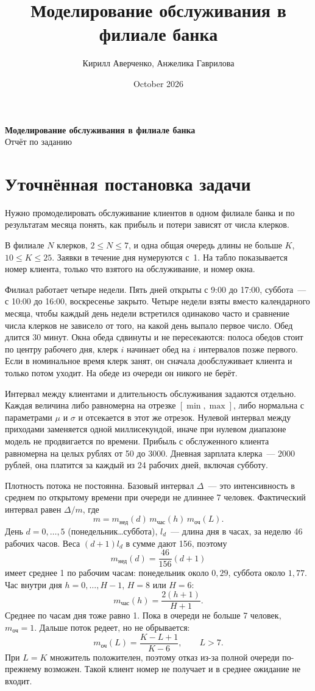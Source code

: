 \documentclass[a4paper,12pt]{article}
\title{Моделирование обслуживания в филиале банка}
\author{Кирилл Аверченко, Анжелика Гаврилова}
\date{October 2026}
\begin{document}
\begin{center}
{\Large\bfseries Моделирование обслуживания в филиале банка}\\[0.55em]
Отчёт по заданию\\[0.25em]
\end{center}

\section{Уточнённая постановка задачи}

Нужно промоделировать обслуживание клиентов в одном филиале банка и по результатам месяца понять, как прибыль и потери зависят от числа клерков.

В филиале \(N\) клерков, \(2 \le N \le 7\), и одна общая очередь длины не больше \(K\), \(10 \le K \le 25\). Заявки в течение дня нумеруются с~1. На табло показывается номер клиента, только что взятого на обслуживание, и номер окна.

Филиал работает четыре недели. Пять дней открыты с 9:00 до 17:00, суббота~--- с 10:00 до 16:00, воскресенье закрыто. Четыре недели взяты вместо календарного месяца, чтобы каждый день недели встретился одинаково часто и сравнение числа клерков не зависело от того, на какой день выпало первое число. Обед длится 30 минут. Окна обеда сдвинуты и не пересекаются: полоса обедов стоит по центру рабочего дня, клерк \(i\) начинает обед на \(i\) интервалов позже первого. Если в номинальное время клерк занят, он сначала дообслуживает клиента и только потом уходит. На обеде из очереди он никого не берёт.

Интервал между клиентами и длительность обслуживания задаются отдельно. Каждая величина либо равномерна на отрезке \([\min,\max]\), либо нормальна с параметрами \(\mu\) и \(\sigma\) и отсекается в этот же отрезок. Нулевой интервал между приходами заменяется одной миллисекундой, иначе при нулевом диапазоне модель не продвигается по времени. Прибыль с обслуженного клиента равномерна на целых рублях от 50 до 3000. Дневная зарплата клерка~--- 2000 рублей, она платится за каждый из 24 рабочих дней, включая субботу.

Плотность потока не постоянна. Базовый интервал \(\Delta\)~--- это интенсивность в среднем по открытому времени при очереди не длиннее 7 человек. Фактический интервал равен \(\Delta / m\), где
\[
m = m_{\text{нед}}(d)\, m_{\text{час}}(h)\, m_{\text{оч}}(L).
\]
День \(d = 0,\ldots,5\) (понедельник\ldots суббота), \(l_d\)~--- длина дня в часах, за неделю 46 рабочих часов. Веса \((d+1)l_d\) в сумме дают 156, поэтому
\[
m_{\text{нед}}(d) = \frac{46}{156}(d+1)
\]
имеет среднее 1 по рабочим часам: понедельник около \(0{,}29\), суббота около \(1{,}77\). Час внутри дня \(h = 0,\ldots,H-1\), \(H = 8\) или \(H = 6\):
\[
m_{\text{час}}(h) = \frac{2(h+1)}{H+1}.
\]
Среднее по часам дня тоже равно 1. Пока в очереди не больше 7 человек, \(m_{\text{оч}} = 1\). Дальше поток редеет, но не обрывается:
\[
m_{\text{оч}}(L) = \frac{K-L+1}{K-6}, \qquad L > 7.
\]
При \(L = K\) множитель положителен, поэтому отказ из-за полной очереди по-прежнему возможен. Такой клиент номер не получает и в среднее ожидание не входит.
\end{document}
